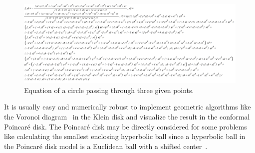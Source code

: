 \documentclass{article}
\begin{document}
\begin{figure}
\centering
\includegraphics[width=\textwidth]{Circle3PointsEquation.png} 
\caption{Equation of a circle passing through three given points.\label{fig:circle3pts} }
\end{figure}



It is usually easy and numerically robust to implement geometric algorithms like the Voronoi diagram~\cite{nielsen2010hyperbolic} in the Klein disk and visualize the result in the conformal Poincar\'e disk.
The Poincar\'e disk may be directly considered for some problems like calculating the smallest enclosing hyperbolic ball since a hyperbolic ball in the Poincar\'e disk model is a Euclidean ball with a shifted center~\cite{tanuma2010revisiting}.
\end{document}
